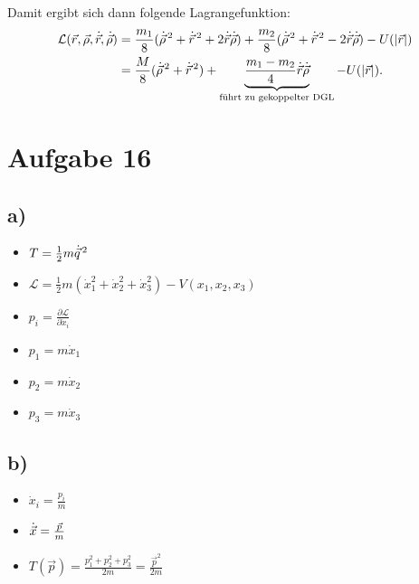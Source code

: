 Damit ergibt sich dann folgende Lagrangefunktion:
\begin{align*}
	\mathcal{L}(\vec{r}, \vec{\rho}, \dot{\vec{r}}, \dot{\vec{\rho}})
	&= \frac{m_1}{8} (\dot{\vec{\rho}}^{\,2} + \dot{\vec{r}}^{\,2} + 2 \dot{\vec{r}} \dot{\vec{\rho}})
	+ \frac{m_2}{8} (\dot{\vec{\rho}}^{\,2} + \dot{\vec{r}}^{\,2} - 2 \dot{\vec{r}} \dot{\vec{\rho}})
	- U(\left\lvert \vec{r} \right\rvert) \\
	&= \frac{M}{8} (\dot{\vec{\rho}}^{\,2} + \dot{\vec{r}}^{\,2}) + \underbrace{\frac{m_1 - m_2}{4} \dot{\vec{r}} \dot{\vec{\rho}}}_{\text{führt zu gekoppelter DGL}} - U(\left\lvert \vec{r} \right\rvert)	
	\text{.}
\end{align*}

\section*{Aufgabe 16}

\subsection*{a)}
\begin{itemize}
	\item $T = \frac{1}{2} m \dot{\vec{q}}^{\,2}$
	\item $\mathcal{L} = \frac{1}{2} m (\dot{x}_1^2 + \dot{x}_2^2 + \dot{x}_3^2) - V(x_1, x_2, x_3)$
	\item $p_i = \frac{\partial \mathcal{L}}{\partial \dot{x}_i}$
	\item $p_1 = m \dot{x}_1$
	\item $p_2 = m \dot{x}_2$
	\item $p_3 = m \dot{x}_3$
\end{itemize}

\subsection*{b)}
\begin{itemize}
	\item $\dot{x}_i = \frac{p_i}{m}$
	\item $\dot{\vec{x}} = \frac{\vec{p}}{m}$
	\item $T(\vec{p}) = \frac{p_1^2 + p_2^2 + p_3^2}{2m} = \frac{\vec{p}^2}{2 m}$
\end{itemize}

